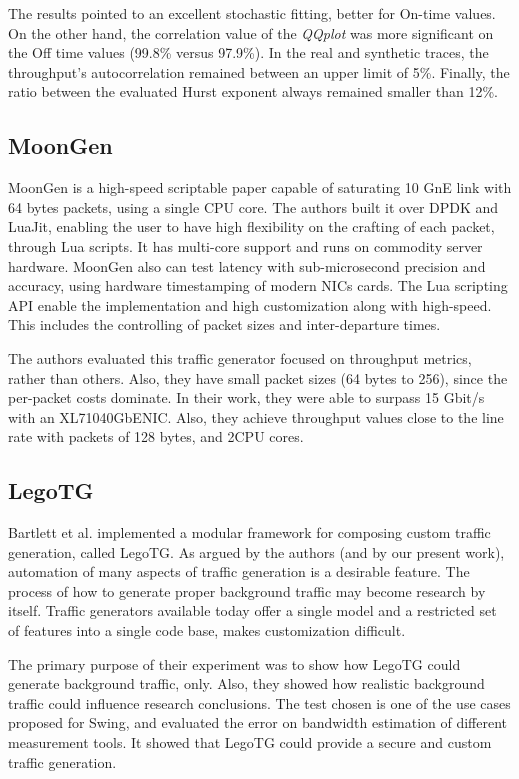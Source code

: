 The results pointed to an excellent stochastic fitting, better for On-time values. On the other hand, the correlation value of the \textit{QQplot} was more significant on the Off time values (99.8\% versus 97.9\%). In the real and synthetic traces, the throughput's autocorrelation  remained between an upper limit of 5\%. Finally, the ratio between the evaluated Hurst exponent always remained smaller than 12\%.

\subsection{MoonGen}

MoonGen\cite{moongen-paper} is a high-speed scriptable paper capable of saturating 10 GnE link with 64 bytes packets, using a single CPU core. The authors built it over DPDK and LuaJit, enabling the user to have high flexibility on the crafting of each packet, through Lua scripts. It has multi-core support and runs on commodity server hardware. MoonGen also can test latency with sub-microsecond precision and accuracy, using hardware timestamping of modern NICs cards. The Lua scripting API enable the implementation and high customization along with high-speed. This includes the controlling of packet sizes and inter-departure times. 

The authors evaluated this traffic generator focused on throughput metrics, rather than others. Also, they have small packet sizes (64 bytes to 256), since the per-packet costs dominate. In their work, they were able to surpass 15 Gbit/s with an XL71040GbENIC. Also, they achieve throughput values close to the line rate with packets of 128 bytes, and 2CPU cores.

\subsection{LegoTG}

Bartlett et al.\cite{legotg-paper} implemented a modular framework for composing custom traffic generation, called LegoTG. As argued by the authors (and by our present work), automation of many aspects of traffic generation is a desirable feature. The process of how to generate proper background traffic may become research by itself. Traffic generators available today offer a single model and a restricted set of features into a single code base, makes customization difficult. 

The primary purpose of their experiment was to show how LegoTG could generate background traffic, only. Also, they showed how realistic background traffic could influence research conclusions. The test chosen is one of the use cases proposed for Swing\cite{background-traffic-matter}, and evaluated the error on bandwidth estimation of different measurement tools. It showed that LegoTG could provide a secure and custom traffic generation.


